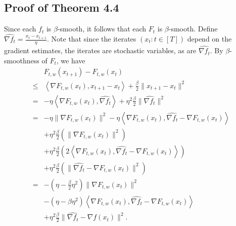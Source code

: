 \documentclass{article}
\newcommand{\ang}[1]{\left<#1\right>}
\begin{document}
\begin{appendix}
\section{Proof of Theorem 4.4}

Since each $f_t$ is $\beta$-smooth, it follows that each $F_t$ is $\beta$-smooth. Define $\widehat{\nabla f_{t}} = \frac{x_t-x_{t+1}}{\eta}$. 
 Note that since the iterates $(x_t:t\in [T])$ depend on the gradient estimates, the iterates are stochastic variables, as are $\widehat{\nabla f_{t}}$. By $\beta$-smoothness of $F_t$, we have
\begin{align*}
&F_{t,w}(x_{t+1})-F_{t,w}(x_t) \\
\leq& \ang{\nabla F_{t,w}(x_t), x_{t+1}-x_t}+\frac{\beta}{2} \|x_{t+1}-x_t\|^2\\
 =& -\eta\ang{\nabla F_{t,w}(x_t), \widehat{\nabla f_{t}}} + \eta^2\frac{\beta}{2} \|\widehat{\nabla f_{t}}\|^2 \\
 =& -\eta \|\nabla F_{t,w}(x_t)\|^2 - \eta\ang{\nabla F_{t,w}(x_t), \widehat{\nabla f_{t}}-\nabla F_{t,w}(x_t)} \\
 &+ \eta^2\frac{\beta}{2}\left( \|\nabla F_{t,w}(x_t)\|^2 \right)\\
 &+ \eta^2\frac{\beta}{2}\left(2\ang{\nabla F_{t,w}(x_t),\widehat{\nabla f_t}-\nabla F_{t,w}(x_t)}\right)\\
 &+  \eta^2\frac{\beta}{2}\left(\|\widehat{\nabla f_{t}}-\nabla F_{t,w}(x_t)\|^2\right) \\
 =& - \left(\eta-\frac{\beta}{2}\eta^2\right) \|\nabla F_{t,w}(x_t)\|^2 \\
 &- (\eta-\beta \eta^2)\ang{\nabla F_{t,w}(x_t), \widehat{\nabla f_{t}}-\nabla F_{t,w}(x_t)} \\
 &+ \eta^2\frac{\beta}{2}  \|\widehat{\nabla f_{t}}-\nabla f(x_t)\|^2.
 \end{align*}


\end{appendix}
\end{document}
